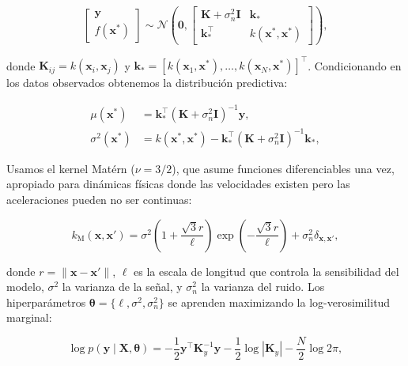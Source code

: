 \documentclass[conference]{IEEEtran}
\begin{document}
\begin{equation}
\begin{bmatrix} \mathbf{y} \\ f(\mathbf{x}^*) \end{bmatrix} \sim
\mathcal{N}\!\left(\mathbf{0}, \begin{bmatrix}
\mathbf{K} + \sigma_n^2 \mathbf{I} & \mathbf{k}_* \\
\mathbf{k}_*^\top & k(\mathbf{x}^*, \mathbf{x}^*)
\end{bmatrix}\right),
\label{eq:conjunta}
\end{equation}

donde $\mathbf{K}_{ij} = k(\mathbf{x}_i, \mathbf{x}_j)$ y $\mathbf{k}_* = [k(\mathbf{x}_1, \mathbf{x}^*), \dots, k(\mathbf{x}_N, \mathbf{x}^*)]^\top$. Condicionando en los datos observados obtenemos la distribución predictiva:

\begin{align}
\mu(\mathbf{x}^*) &= \mathbf{k}_*^\top (\mathbf{K} + \sigma_n^2 \mathbf{I})^{-1} \mathbf{y},\\
\sigma^2(\mathbf{x}^*) &= k(\mathbf{x}^*, \mathbf{x}^*) - \mathbf{k}_*^\top (\mathbf{K} + \sigma_n^2 \mathbf{I})^{-1} \mathbf{k}_*,
\end{align}

Usamos el kernel Matérn ($\nu=3/2$), que asume funciones diferenciables una vez, apropiado para dinámicas físicas donde las velocidades existen pero las aceleraciones pueden no ser continuas:

\begin{equation}
k_{\text{M}}(\mathbf{x}, \mathbf{x}') = \sigma^2 \!\left(1 + \frac{\sqrt{3}r}{\ell}\right) \exp\!\left(-\frac{\sqrt{3}r}{\ell}\right) + \sigma_n^2 \delta_{\mathbf{x},\mathbf{x}'},
\label{eq:matern}
\end{equation}

donde $r = \|\mathbf{x} - \mathbf{x}'\|$, $\ell$ es la escala de longitud que controla la sensibilidad del modelo, $\sigma^2$ la varianza de la señal, y $\sigma_n^2$ la varianza del ruido. Los hiperparámetros $\boldsymbol{\theta} = \{\ell, \sigma^2, \sigma_n^2\}$ se aprenden maximizando la log-verosimilitud marginal:

\begin{equation}
\log p(\mathbf{y} \mid \mathbf{X}, \boldsymbol{\theta}) = -\frac{1}{2} \mathbf{y}^\top \mathbf{K}_y^{-1} \mathbf{y} - \frac{1}{2} \log |\mathbf{K}_y| - \frac{N}{2} \log 2\pi,
\label{eq:lml}
\end{equation}
\end{document}
